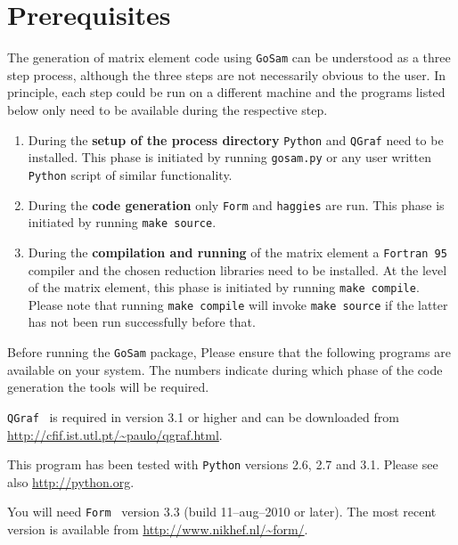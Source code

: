 \documentclass[11pt,a4paper]{refrep}
\newcommand{\golemversion}{{1{.}0}}
\newcommand{\golemv}[1][\golemversion]{{\tt GoSam}\xspace}
\newcommand{\qgraf}{{\tt QGraf}\xspace}
\newcommand{\form}{{\tt Form}\xspace}
\newcommand{\python}{{\tt Python}\xspace}
\newcommand{\fortranXC}{{\tt Fortran\,95}\xspace}
\newcommand{\haggies}{{\tt haggies}\xspace}
\begin{document}
\section{Prerequisites}
The generation of matrix element code using \golemv can be understood
as a three step process, although the three steps are not necessarily
obvious to the user. In principle, each step could be run on a different
machine and the programs listed below only need to be available during
the respective step.
\begin{enumerate}
\item During the {\bf setup of the process directory} \python
and \qgraf need to be installed. This phase is initiated by
running \texttt{gosam.py}
or any user written \python script of similar functionality.
\item During the {\bf code generation} only \form and \haggies are run.
This phase is initiated by running \texttt{make source}.
\item During the {\bf compilation and running} of the matrix element
a \fortranXC compiler and the chosen reduction libraries need to be installed.
At the level of the matrix element, this phase is initiated
by running \texttt{make compile}. Please note that running
\texttt{make compile} will invoke \texttt{make source} if the latter
has not been run successfully before that.
\end{enumerate}

Before running the \golemv package, Please ensure that
the following programs are available on your system.
The numbers indicate during which phase of the code generation
the tools will be required.

\marginlabel{\qgraf (1)} \qgraf~\cite{Nogueira:1991ex}
is required in version 3{.}1 or
higher and can be downloaded from
\url{http://cfif.ist.utl.pt/~paulo/qgraf.html}.

\marginlabel{\python (1)} This program has been tested with \python{}
versions 2{.}6, 2{.}7 and 3{.}1.
Please see also \url{http://python.org}.

\marginlabel{\form (2)} You will need \form~\cite{Vermaseren:2000nd}
version 3{.}3 (build
11--aug--2010 or later).
The most recent version is available from
\url{http://www.nikhef.nl/~form/}.
\end{document}
